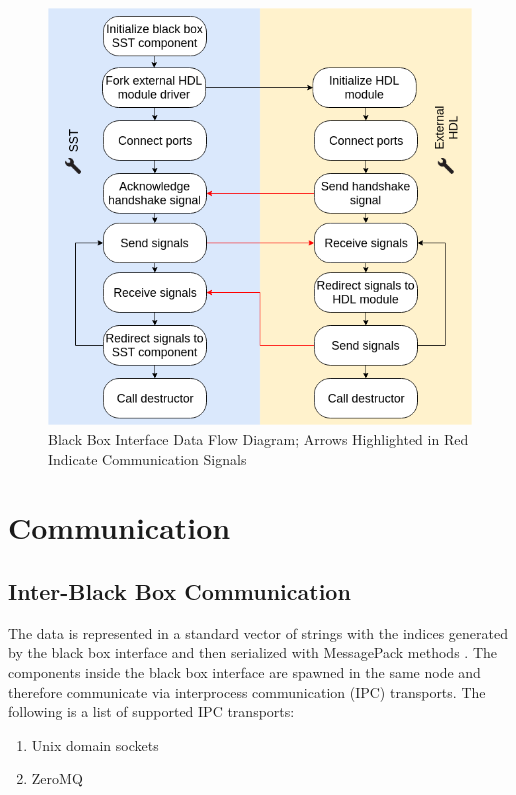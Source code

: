 \documentclass{article}
\begin{document}
  \begin{figure}[!h]
    \centering
    \includegraphics[width=5in]{diagrams/data_flow.png}
    \caption{Black Box Interface Data Flow Diagram; Arrows Highlighted in Red Indicate
    Communication Signals}
    \label{fig:data_flow}
  \end{figure}

  \section{Communication}

    \subsection{Inter-Black Box Communication} \label{sec:ipc}
    The data is represented in a standard vector of strings with the indices generated by the black
    box interface and then serialized with MessagePack methods \cite{msgpack}. The components inside
    the black box interface are spawned in the same node and therefore communicate via interprocess
    communication (IPC) transports. The following is a list of supported IPC transports:
    \begin{enumerate}
      \item Unix domain sockets
      \item ZeroMQ
    \end{enumerate}
\end{document}
